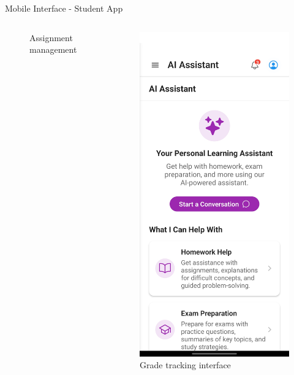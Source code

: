 \documentclass[aspectratio=169]{beamer}
\begin{document}
\begin{frame}{Mobile Interface - Student App}
\begin{columns}
\begin{figure}
            \caption{Assignment management}
        \end{figure}
        \begin{figure}
            \includegraphics[width=\textwidth,height=0.6\textheight,keepaspectratio]{../pfe-pics/Mobile /Students/Screenshot_20250610_130351_Expo Go.jpg}
            \caption{Grade tracking interface}
        \end{figure}
    \end{columns}
\end{frame}
\end{document}
